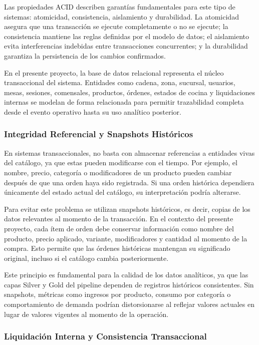 Las propiedades ACID describen garantías fundamentales para este tipo de sistemas:
atomicidad, consistencia, aislamiento y durabilidad. La atomicidad asegura que una
transacción se ejecute completamente o no se ejecute; la consistencia mantiene las reglas
definidas por el modelo de datos; el aislamiento evita interferencias indebidas entre
transacciones concurrentes; y la durabilidad garantiza la persistencia de los cambios
confirmados.

En el presente proyecto, la base de datos relacional representa el núcleo transaccional
del sistema. Entidades como cadena, zona, sucursal, usuarios, mesas, sesiones, comensales,
productos, órdenes, estados de cocina y liquidaciones internas se modelan de forma
relacionada para permitir trazabilidad completa desde el evento operativo hasta su uso
analítico posterior.

\subsubsection{Integridad Referencial y Snapshots Históricos}

En sistemas transaccionales, no basta con almacenar referencias a entidades vivas del
catálogo, ya que estas pueden modificarse con el tiempo. Por ejemplo, el nombre, precio,
categoría o modificadores de un producto pueden cambiar después de que una orden haya sido
registrada. Si una orden histórica dependiera únicamente del estado actual del catálogo,
su interpretación podría alterarse.

Para evitar este problema se utilizan snapshots históricos, es decir, copias de los datos
relevantes al momento de la transacción. En el contexto del presente proyecto, cada ítem de
orden debe conservar información como nombre del producto, precio aplicado, variante,
modificadores y cantidad al momento de la compra. Esto permite que las órdenes históricas
mantengan su significado original, incluso si el catálogo cambia posteriormente.

Este principio es fundamental para la calidad de los datos analíticos, ya que las capas
Silver y Gold del pipeline dependen de registros históricos consistentes. Sin snapshots,
métricas como ingresos por producto, consumo por categoría o comportamiento de demanda
podrían distorsionarse al reflejar valores actuales en lugar de valores vigentes al momento
de la operación.

\subsubsection{Liquidación Interna y Consistencia Transaccional}

